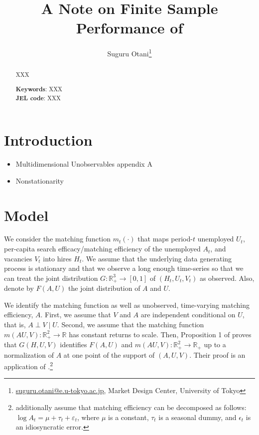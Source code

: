 \documentclass[12pt]{article}
\begin{document}
\title{A Note on Finite Sample Performance of \cite{lange2020beyond}}
\author{Suguru Otani\thanks{\href{mailto:}{suguru.otani@e.u-tokyo.ac.jp}, Market Design Center, University of Tokyo}}
\maketitle

\begin{abstract}
\noindent
XXX

\textbf{Keywords}: XXX \\
\textbf{JEL code}: XXX
\end{abstract}

\section{Introduction}

\begin{itemize}
    \item Multidimensional Unobservables \cite{matzkin2003nonparametric} appendix A
    \item Nonstationarity
\end{itemize}

\section{Model}
We consider the matching function $m_t(\cdot)$ that maps period-$t$ unemployed $U_t$, per-capita search efficacy/matching efficiency of the unemployed $A_t$, and vacancies $V_t$ into hires $H_t$.
We assume that the underlying data generating process is stationary and that we observe a long enough time-series so that we can treat the joint distribution $G: \mathbb{R}_{+}^3 \rightarrow[0,1]$ of $\left(H_t, U_t, V_t\right)$ as observed. 
Also, denote by $F(A, U)$ the joint distribution of $A$ and $U$.

We identify the matching function as well as unobserved, time-varying matching efficiency, $A .$ 
First, we assume that $V$ and $A$ are independent conditional on $U$, that is, $A \perp V \mid U$. 
Second, we assume that the matching function $m(AU,V):\mathbb{R}_{+}^2 \rightarrow \mathbb{R}$ has constant returns to scale. 
Then, Proposition 1 of \cite{lange2020beyond} proves that $G(H, U, V)$ identifies $F(A, U)$ and $m(A U, V): \mathbb{R}_{+}^2 \rightarrow \mathbb{R}_{+}$ up to a normalization of $A$ at one point of the support of $(A, U, V)$. Their proof is an application of \cite{matzkin2003nonparametric}.\footnote{\cite{borowczyk2013accounting} additionally assume that matching efficiency can be decomposed as follows: $\log A_{t}=\mu + \tau_{t} + \varepsilon_{t}$, where $\mu$ is a constant, $\tau_t$ is a seasonal dummy, and $\epsilon_t$ is an idiosyncratic error.}
\end{document}
